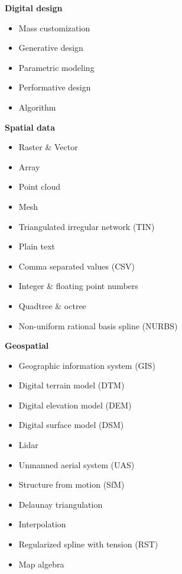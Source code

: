 \documentclass[11pt,article,oneside]{memoir}
\begin{document}
\begin{multicols}{2}
\raggedright
\small
%
\textbf{Digital design}
\begin{itemize}
\item Mass customization
\item Generative design
\item Parametric modeling
\item Performative design
\item Algorithm
\end{itemize}

\textbf{Spatial data}
\begin{itemize}
\item Raster \& Vector
\item Array
\item Point cloud
\item Mesh
\item Triangulated irregular network (TIN)
\item Plain text
\item Comma separated values (CSV)
\item Integer \& floating point numbers
\item Quadtree \& octree
\item Non-uniform rational basis spline (NURBS)
\end{itemize}

\textbf{Geospatial}
\begin{itemize}
\item Geographic information system (GIS)
\item Digital terrain model (DTM)
\item Digital elevation model (DEM)
\item Digital surface model (DSM)
\item Lidar
\item Unmanned aerial system (UAS)
\item Structure from motion (SfM)
\item Delaunay triangulation
\item Interpolation
\item Regularized spline with tension (RST)
\item Map algebra
\end{itemize}


\end{multicols}
\end{document}
